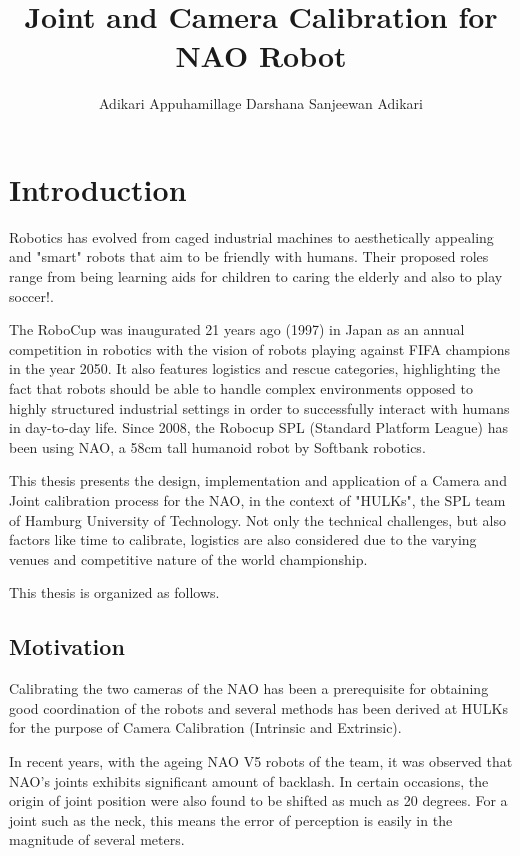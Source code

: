 \documentclass[english, printversion, nomenclature, notitle]{tuvisionthesis} %
\author{Adikari Appuhamillage Darshana Sanjeewan Adikari}
\title{Joint and Camera Calibration for NAO Robot}
\begin{document}
\hypersetup{
	pdfauthor=\@author\relax,
	pdftitle=\@title\relax
}
\tuvisionheading
\hypersetup{pageanchor=true}
\clearpage{\thispagestyle{empty}\cleardoublepage}

\chapter{Introduction}

Robotics has evolved from caged industrial machines to aesthetically appealing and "smart" robots that aim to be friendly with humans. Their proposed roles range from being learning aids for children to caring the elderly and also to play soccer!.

The RoboCup was inaugurated 21 years ago (1997) in Japan as an annual competition in robotics with the vision of robots playing against FIFA champions in the year 2050. It also features  logistics and rescue categories, highlighting  the fact that robots should be able to handle complex environments opposed to highly structured industrial settings in order to successfully interact with humans in day-to-day life.  Since 2008, the Robocup SPL (Standard Platform League) has been using NAO, a 58cm tall humanoid robot by Softbank robotics.

This thesis presents the design, implementation and application of a Camera and Joint calibration process for the NAO, in the context of "HULKs", the SPL team of Hamburg University of Technology. Not only the technical challenges, but also factors like time to calibrate, logistics are also considered due to the varying venues and competitive nature of the world championship.

This thesis is organized as follows. 

\section{Motivation}

Calibrating the two cameras of the NAO has been a prerequisite for obtaining good coordination of the robots and several methods has been derived at HULKs for the purpose of Camera Calibration (Intrinsic and Extrinsic). 

In recent years, with the ageing NAO V5 robots of the team, it was observed that NAO's joints exhibits significant amount of backlash. In certain occasions, the origin of joint position were also found to be shifted as much as 20 degrees. For a joint such as the neck, this means the error of perception is easily in the magnitude of several meters.
\end{document}
